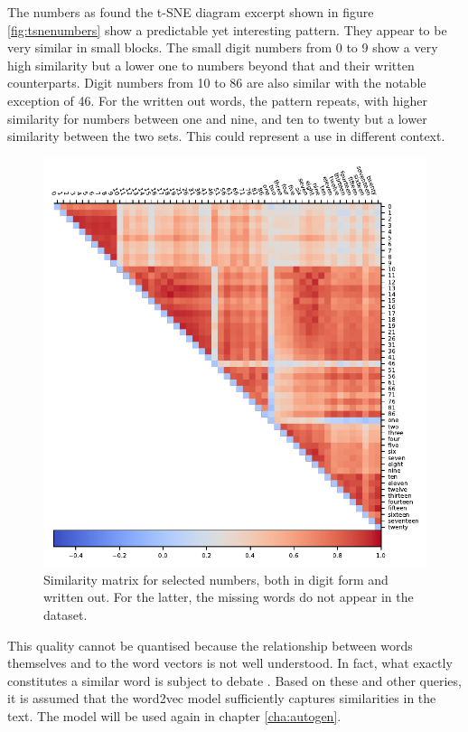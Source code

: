 \documentclass[10pt, a4paper]{UUThesisTemplate}
\begin{document}
The numbers as found the t-SNE diagram excerpt shown in figure \ref{fig:tsnenumbers} show a predictable yet interesting pattern. They appear to be very similar in small blocks. The small digit numbers from 0 to 9 show a very high similarity but a lower one to numbers beyond that and their written counterparts. Digit numbers from 10 to 86 are also similar with the notable exception of 46. For the written out words, the pattern repeats, with higher similarity for numbers between one and nine, and ten to twenty but a lower similarity between the two sets. This could represent a use in different context.

\begin{figure}[hbt]
\includegraphics{figures/simmat_numbers.pdf}
\caption{Similarity matrix for selected numbers, both in digit form and written out. For the latter, the missing words do not appear in the dataset.}\label{fig:simmatrixnumbers}
\end{figure}

 This quality cannot be quantised because the relationship between words themselves and to the word vectors is not well understood. In fact, what exactly constitutes a similar word is subject to debate \cite{learningwv}. Based on these and other queries, it is assumed that the word2vec model sufficiently captures similarities in the text. The model will be used again in chapter \ref{cha:autogen}.
\end{document}
